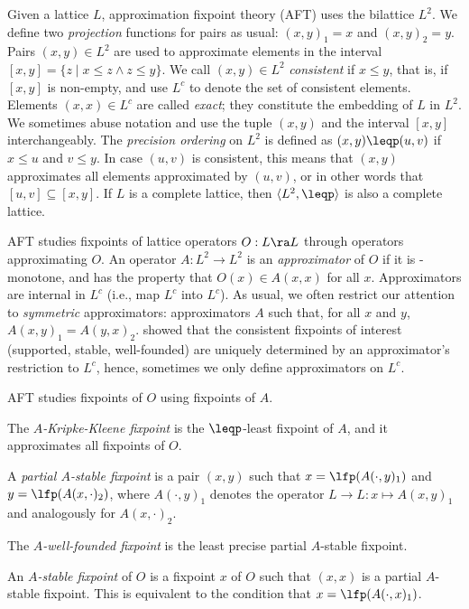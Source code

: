 Given a lattice $L$, approximation fixpoint theory (AFT) uses the bilattice 
$L^2$.  We define two \emph{projection} functions for pairs as usual:
$(x,y)_1=x$ and $(x,y)_2=y$.  Pairs $(x,y)\in L^2$ are used to
approximate elements in the interval $[x,y] = \{z\mid x\leq
z\wedge z\leq y\}$. We call $(x,y)\in L^2$ \emph{consistent} if $x\leq 
y$, that is, if $[x,y]$ is non-empty, and use $L^c$ to denote the set
of consistent elements. Elements $(x,x) \in L^c$ are called
\emph{exact}; they constitute the embedding of $L$ in $L^2$.  We sometimes abuse notation and use the tuple $(x,y)$
and the interval $[x,y]$ interchangeably.  The \emph{precision
  ordering} on $L^2$ is defined as $(x,y) \leqp (u,v)$ if $x\leq u$
and $v\leq y$. In case $(u,v)$ is consistent, this means that $(x,y)$
approximates all elements approximated by $(u,v)$, or in other words
that $[u,v]\subseteq [x,y]$.  If $L$ is a complete lattice, then
$\langle L^2,\leqp\rangle$ is also a complete lattice.
  


AFT studies fixpoints of lattice operators $O:L\ra L$ through operators approximating $O$.
 An operator $A: L^2\to L^2$  is an \emph{approximator} of $O$ if it is \leqp-monotone,  and has the property that $O(x)\in A(x,x)$ for all $x$. %
Approximators are
internal in $L^c$ (i.e., map $L^c$ into $L^c$).
As usual, we often restrict our attention to \emph{symmetric} approximators: approximators $A$ such that, for all $x$ and $y$, $A(x,y)_1 = A(y,x)_2$. %
\citet{DeneckerMT04} showed that the consistent fixpoints of interest (supported, stable, well-founded) are uniquely determined by an approximator's restriction to $L^c$, hence, sometimes we only define approximators on $L^c$. 

AFT studies fixpoints of $O$ using fixpoints of $A$. 
 \begin{compactitem}
  \item The \emph{$A$-Kripke-Kleene fixpoint} is the $\leqp$-least fixpoint of $A$, and it approximates all fixpoints of $O$. 
\item A \emph{partial $A$-stable fixpoint} is a pair  $(x,y)$ such that $x=\lfp(A(\cdot,y)_1)$ and $y=\lfp(A(x,\cdot)_2)$, where $A(\cdot,y)_1$ denotes the operator $L\to L:x\mapsto A(x,y)_1$ and analogously for $A(x,\cdot)_2$. 
\item The \emph{$A$-well-founded fixpoint} is the least precise partial $A$-stable fixpoint. 
\item  An \emph{$A$-stable fixpoint} of $O$ is a fixpoint $x$ of $O$ such that $(x,x)$ is a partial $A$-stable fixpoint. This is equivalent to the condition that $x=\lfp(A(\cdot, x)_1)$.
 \end{compactitem}

